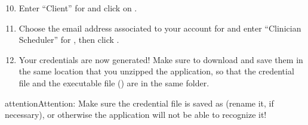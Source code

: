 \documentclass[letterpaper,10pt,english]{sphinxmanual}
\begin{document}
\begin{figure}[H]
\centering
{}\end{figure}
\begin{enumerate}
\setcounter{enumi}{9}
\item {} 
Enter “Client” for  and click on .

\end{enumerate}

\begin{figure}[H]
\centering
{}\end{figure}
\begin{enumerate}
\setcounter{enumi}{10}
\item {} 
Choose the email address associated to your account for 
and enter “Clinician Scheduler” for , then
click .

\end{enumerate}

\begin{figure}[H]
\centering
{}\end{figure}
\begin{enumerate}
\setcounter{enumi}{11}
\item {} 
Your credentials are now generated! Make sure to download and save
them in the same location that you unzipped the application, so that
the credential file and the executable file () are in the same folder.

\end{enumerate}

\begin{figure}[H]
\centering
{}\end{figure}

\begin{sphinxadmonition}{attention}{Attention:}
Make sure the credential file is saved as  (rename it, if necessary),
or otherwise the application will not be able to recognize it!
\end{sphinxadmonition}
\end{document}

